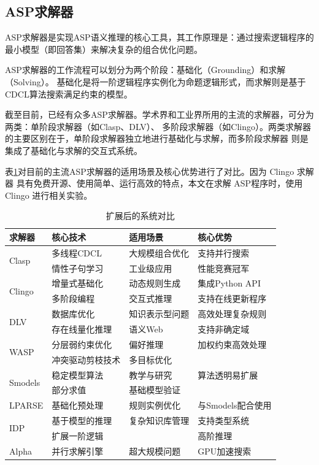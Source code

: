 \subsection{ASP求解器}
ASP求解器是实现ASP语义推理的核心工具，其工作原理是：通过搜索逻辑程序的最小模型（即回答集）来解决复杂的组合优化问题。

ASP求解器的工作流程可以划分为两个阶段：基础化（Grounding）和求解（Solving）。
基础化是将一阶逻辑程序实例化为命题逻辑形式，而求解则是基于CDCL算法搜索满足约束的模型。

截至目前，已经有众多ASP求解器。学术界和工业界所用的主流的求解器，可分为两类：单阶段求解器（如Clasp、DLV）、
多阶段求解器（如Clingo）。两类求解器的主要区别在于，单阶段求解器独立地进行基础化与求解，而多阶段求解器
则是集成了基础化与求解的交互式系统。

表\ref{tab:solver_comparison}对目前的主流ASP求解器的适用场景及核心优势进行了对比。因为 Clingo 求解器
具有免费开源、使用简单、运行高效的特点，本文在求解 ASP程序时，使用 Clingo 进行相关实验。
\begin{table}[h]
    \centering
    \renewcommand{\arraystretch}{1.2}
    \begin{tabular}{l l l l}
        \toprule
        \textbf{求解器} & \textbf{核心技术} & \textbf{适用场景} & \textbf{核心优势} \\
        \midrule
        \multirow{2}{*}{Clasp} & 多线程CDCL & 大规模组合优化 & 支持并行搜索 \\
                               & 情性子句学习 & 工业级应用 & 性能竞赛冠军 \\
        \midrule
        \multirow{2}{*}{Clingo} & 增量式基础化 & 动态规则生成 & 集成Python API \\
                                & 多阶段编程 & 交互式推理 & 支持在线更新程序 \\
        \midrule
        \multirow{2}{*}{DLV} & 数据库优化 & 知识表示型问题 & 高效处理复杂规则 \\
                             & 存在线量化推理 & 语义Web & 支持非确定域 \\
        \midrule
        \multirow{2}{*}{WASP} & 分层弱约束优化 & 偏好推理 & 加权约束高效处理 \\
                              & 冲突驱动剪枝技术 & 多目标优化 & \\
        \midrule
        \multirow{2}{*}{Smodels} & 稳定模型算法 & 教学与研究 & 算法透明易扩展 \\
                                 & 部分求值 & 基础模型验证 & \\
        \midrule
        LPARSE & 基础化预处理 & 规则实例优化 & 与Smodels配合使用 \\
        \midrule
        \multirow{2}{*}{IDP} & 基于模型的推理 & 复杂知识库管理 & 支持类型系统 \\
                             & 扩展一阶逻辑 & & 高阶推理 \\
        \midrule
        Alpha & 并行求解引擎 & 超大规模问题 & GPU加速搜索 \\
        \bottomrule
    \end{tabular}
    \caption{扩展后的系统对比}
    \label{tab:solver_comparison}
\end{table}
